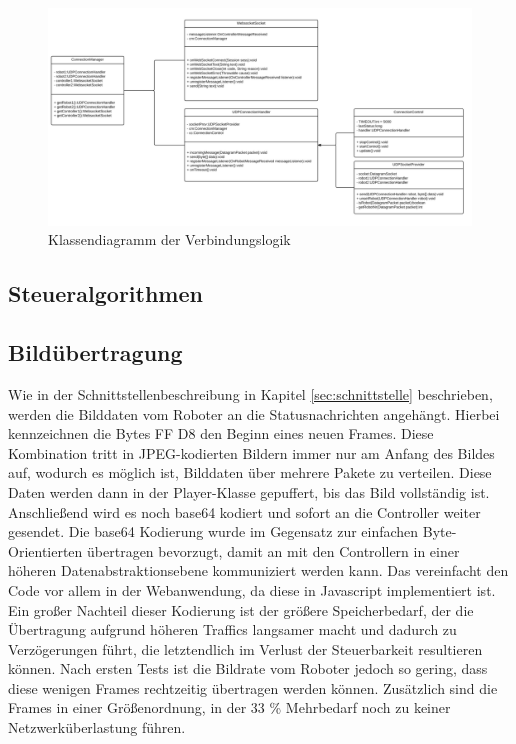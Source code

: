 \begin{figure}[h]
	\includegraphics[width=\textwidth]{images/uml_verbindung.pdf}
	\caption{Klassendiagramm der Verbindungslogik}
	\label{fig:uml_verbindung}
\end{figure}



\subsection{Steueralgorithmen}


\subsection{Bildübertragung}
Wie in der Schnittstellenbeschreibung in Kapitel \ref{sec:schnittstelle} beschrieben, werden die Bilddaten vom Roboter an die Statusnachrichten angehängt. Hierbei kennzeichnen die Bytes FF D8 den Beginn eines neuen Frames. Diese Kombination tritt in JPEG-kodierten Bildern immer nur am Anfang des Bildes auf, wodurch es möglich ist, Bilddaten über mehrere Pakete zu verteilen. Diese Daten werden dann in der Player-Klasse gepuffert, bis das Bild vollständig ist. Anschließend wird es noch base64 kodiert und sofort an die Controller weiter gesendet. Die base64 Kodierung wurde im Gegensatz zur einfachen Byte-Orientierten übertragen bevorzugt, damit an mit den Controllern in einer höheren Datenabstraktionsebene kommuniziert werden kann. Das vereinfacht den Code vor allem in der Webanwendung, da diese in Javascript implementiert ist. Ein großer Nachteil dieser Kodierung ist der größere Speicherbedarf, der die Übertragung aufgrund höheren Traffics langsamer macht und dadurch zu Verzögerungen führt, die letztendlich im Verlust der Steuerbarkeit resultieren können. Nach ersten Tests ist die Bildrate vom Roboter jedoch so gering, dass diese wenigen Frames rechtzeitig übertragen werden können. Zusätzlich sind die Frames in einer Größenordnung, in der 33 \% Mehrbedarf noch zu keiner Netzwerküberlastung führen.



